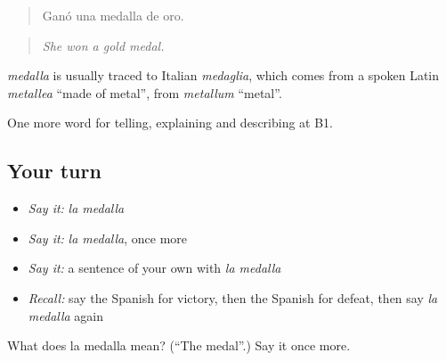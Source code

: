 \begin{quote}
Ganó una medalla de oro.
\end{quote}

\begin{quote}
\emph{She won a gold medal.}
\end{quote}

\begin{cousinweb}
\emph{medalla} is usually traced to Italian \emph{medaglia}, which comes from a spoken Latin \emph{metallea} \textquotedblleft{}made of metal\textquotedblright{}, from \emph{metallum} \textquotedblleft{}metal\textquotedblright{}.
\end{cousinweb}

\begin{grammarlens}[title={What you've built}]
One more word for telling, explaining and describing at B1.
\end{grammarlens}

\subsection*{Your turn}
\begin{itemize}
\raggedright
  \item \emph{Say it:} \emph{la medalla}
  \item \emph{Say it:} \emph{la medalla}, once more
  \item \emph{Say it:} a sentence of your own with \emph{la medalla}
  \item \emph{Recall:} say the Spanish for victory, then the Spanish for defeat, then say \emph{la medalla} again
\end{itemize}

\begin{tcolorbox}[breakable,colback=teal!4,colframe=teal!35!black,title={Before you move on}]
What does la medalla mean? (\textquotedblleft{}The medal\textquotedblright{}.) Say it once more.
\end{tcolorbox}

